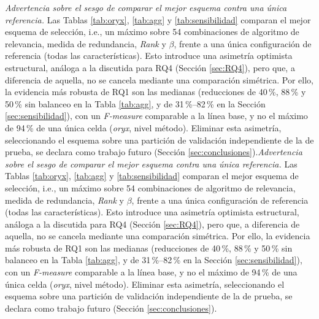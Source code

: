 \documentclass[conference,a4paper]{IEEEtran}
\newif\ifmarcarcambios
\newcommand{\cambio}[1]{\ifmarcarcambios\ifvmode\leavevmode\fi{\color{azulcambio}#1}\else#1\fi}
\begin{document}
\cambio{\textit{Advertencia sobre el sesgo de comparar el mejor esquema contra una única referencia.} Las Tablas \ref{tab:oryx}, \ref{tab:agg} y \ref{tab:sensibilidad} comparan el mejor esquema de selección, i.e., un máximo sobre 54 combinaciones de algoritmo de relevancia, medida de redundancia, \textit{Rank} y $\beta$, frente a una única configuración de referencia (todas las características). Esto introduce una asimetría optimista estructural, análoga a la discutida para RQ4 (Sección \ref{sec:RQ4}), pero que, a diferencia de aquella, no se cancela mediante una comparación simétrica. Por ello, la evidencia más robusta de RQ1 son las medianas (reducciones de 40\,\%, 88\,\% y 50\,\% sin balanceo en la Tabla \ref{tab:agg}, y de 31\,\%--82\,\% en la Sección \ref{sec:sensibilidad}), con un \textit{F-measure} comparable a la línea base, y no el máximo de 94\,\% de una única celda (\textit{oryx}, nivel método). Eliminar esta asimetría, seleccionando el esquema sobre una partición de validación independiente de la de prueba, se declara como trabajo futuro (Sección \ref{sec:conclusiones}).}

\begin{table}[H]
\caption{Mejor resultado por nivel (proyecto \textit{oryx}): características originales vs. seleccionadas}
\label{tab:oryx}
\centering
{}
\end{table}

\begin{table}[H]
\caption{Mejor \textit{F-measure} por proyecto agregado sobre los 15 proyectos individuales (mediana [mín--máx])}
\label{tab:agg}
\centering
{}
\end{table}
\end{document}
